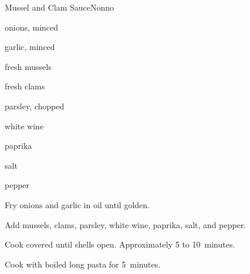 \begin{recipe}{Mussel and Clam Sauce\FIXME}{Nonno}{}

\begin{ingredients}
\item onions, minced
\item garlic, minced
\item fresh mussels
\item fresh clams
\item parsley, chopped
\item white wine
\item paprika
\item salt
\item pepper
\end{ingredients}

\begin{directions}
\item Fry onions and garlic in oil until golden.
\item Add mussels, clams, parsley, white wine, paprika, salt, and pepper.
\item Cook covered until shells open. Approximately 5 to 10~minutes.
\item Cook with boiled long pasta for 5~minutes.
\end{directions}

\end{recipe}
